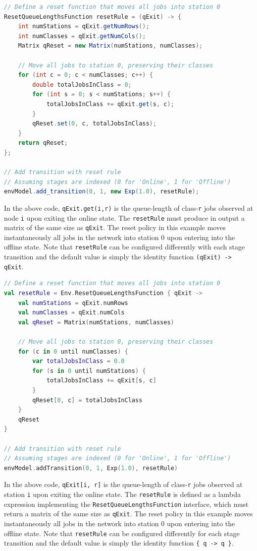 \begin{JAVA}
\begin{lstlisting}[language = java]
// Define a reset function that moves all jobs into station 0
ResetQueueLengthsFunction resetRule = (qExit) -> {
    int numStations = qExit.getNumRows();
    int numClasses = qExit.getNumCols();
    Matrix qReset = new Matrix(numStations, numClasses);
    
    // Move all jobs to station 0, preserving their classes
    for (int c = 0; c < numClasses; c++) {
        double totalJobsInClass = 0;
        for (int s = 0; s < numStations; s++) {
            totalJobsInClass += qExit.get(s, c);
        }
        qReset.set(0, c, totalJobsInClass);
    }
    return qReset;
};

// Add transition with reset rule
// Assuming stages are indexed (0 for 'Online', 1 for 'Offline')
envModel.add_transition(0, 1, new Exp(1.0), resetRule);
\end{lstlisting}
In the above code, \texttt{qExit.get(i,r)} is the queue-length of class-\texttt{r} jobs observed at node \texttt{i} upon exiting the online state. The \texttt{resetRule} must produce in output a matrix of the same size as \texttt{qExit}. The reset policy in this example moves instantaneously all jobs in the network into station 0 upon entering into the offline state. Note that \texttt{resetRule} can be configured differently with each stage transition and the default value is simply the identity function \texttt{(qExit) -> qExit}.
\end{JAVA}
\begin{KOTLIN}
\begin{lstlisting}[language = kotlin]
// Define a reset function that moves all jobs into station 0
val resetRule = Env.ResetQueueLengthsFunction { qExit ->
    val numStations = qExit.numRows
    val numClasses = qExit.numCols
    val qReset = Matrix(numStations, numClasses)

    // Move all jobs to station 0, preserving their classes
    for (c in 0 until numClasses) {
        var totalJobsInClass = 0.0
        for (s in 0 until numStations) {
            totalJobsInClass += qExit[s, c]
        }
        qReset[0, c] = totalJobsInClass
    }
    qReset
}

// Add transition with reset rule
// Assuming stages are indexed (0 for 'Online', 1 for 'Offline')
envModel.addTransition(0, 1, Exp(1.0), resetRule)
\end{lstlisting}
In the above code, \texttt{qExit[i, r]} is the queue-length of class-\texttt{r} jobs observed at station \texttt{i} upon exiting the online state. The \texttt{resetRule} is defined as a lambda expression implementing the \texttt{ResetQueueLengthsFunction} interface, which must return a matrix of the same size as \texttt{qExit}. The reset policy in this example moves instantaneously all jobs in the network into station 0 upon entering into the offline state. Note that \texttt{resetRule} can be configured differently for each stage transition and the default value is simply the identity function \texttt{\{ q -> q \}}.
\end{KOTLIN}
